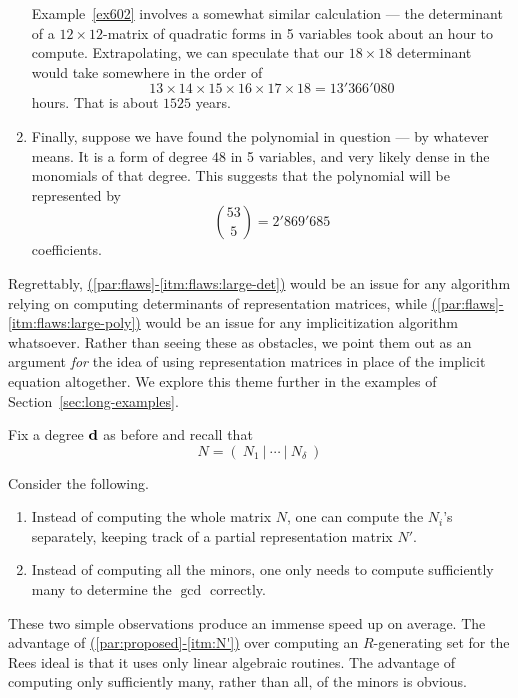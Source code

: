 \documentclass[fleqn,reqno]{amsart}
\renewcommand{\itmref}[2]{{\normalfont\hyperref[#1]{(\ref*{#2}-\ref*{#1})}}}
\begin{document}
\begin{paragraf}
\begin{enumerate}
Example~\ref{ex602} involves a somewhat similar calculation ---
the determinant of a $12\times12$-matrix of quadratic forms in 5 variables
took about an hour to compute.
Extrapolating, we can speculate that our $18\times18$ determinant would take somewhere
in the order of
\[
	13\times14\times15\times16\times17\times18=13'366'080
\]
hours.
That is about $1525$ years.

\item
\label{itm:flaws:large-poly}
Finally, suppose we have found the polynomial in question --- by whatever means.
It is a form of degree $48$ in 5 variables, and very likely dense in the monomials of that degree.
This suggests that the polynomial will be represented by
\[
	\binom{53}{5}=2'869'685
\]
coefficients.
\end{enumerate}
\end{paragraf}

\begin{paragraf*}
Regrettably,
\itmref{itm:flaws:large-det}{par:flaws} would be an issue for any algorithm
relying on computing determinants of representation matrices,
while \itmref{itm:flaws:large-poly}{par:flaws}
would be an issue for any implicitization algorithm whatsoever.
Rather than seeing these as obstacles,
we point them out as an argument {\em for} the idea of using
representation matrices in place of the implicit equation altogether.
We explore this theme further in the examples of Section~\ref{sec:long-examples}.
\end{paragraf*}

\begin{paragraf}
\label{par:proposed}
Fix a degree $\mathbf d$ as before and recall that
\[
	N=(~N_1~|~\cdots~|~N_\delta~)
\]

Consider the following.
\begin{enumerate}
\item
\label{itm:N'}
Instead of computing the whole matrix $N$, one can compute the $N_i$'s separately,
keeping track of a partial representation matrix $N'$.
\item
\label{itm:gcd}
Instead of computing all the minors, one only needs to compute sufficiently many to determine
the $\gcd$ correctly.
\end{enumerate}
\end{paragraf}

\begin{paragraf*}
These two simple observations produce an immense speed up on average.
The advantage of \itmref{itm:N'}{par:proposed} over computing an $R$-generating set for the
Rees ideal is that it uses only linear algebraic routines.
The advantage of computing only sufficiently many, rather than all, of the minors is obvious.
\end{paragraf*}
\end{document}
